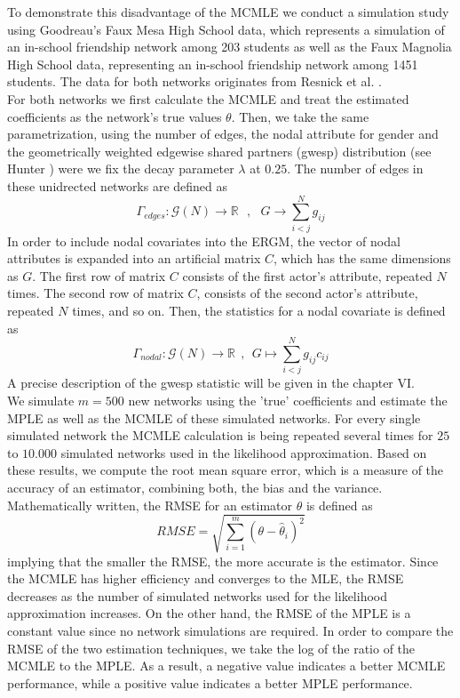 \documentclass[10pt, conference, compsocconf]{IEEEtran}
\begin{document}
\noindent To demonstrate this disadvantage of the MCMLE we conduct a simulation study using Goodreau's Faux Mesa High School data, which represents a simulation of an in-school friendship network among 203 students as well as the Faux Magnolia High School data, representing an in-school friendship network among 1451 students. The data for both networks originates from Resnick et al. \cite{Resnicketal1997}.\\[0.3cm]
For both networks we first calculate the MCMLE and treat the estimated coefficients as the network's true values $\theta$. Then, we take the same parametrization, using the number of edges, the nodal attribute for gender and the geometrically weighted edgewise shared partners (gwesp) distribution (see Hunter \cite{Hunter.2006}) were we fix the decay parameter $\lambda$ at $0.25$.
The number of edges in these unidrected networks are defined as
$$\Gamma_{edges}: \mathcal{G}(N) \to \mathbb{R}~~~, ~~~ G \to \sum_{i<j}^N g_{ij}$$
In order to include nodal covariates into the ERGM, the vector of nodal attributes is expanded into an artificial matrix $C$, which has the same dimensions as $G$. The first row of matrix $C$ consists of the first actor's attribute, repeated $N$ times. The second row of matrix $C$, consists of the second actor's attribute, repeated $N$ times, and so on. Then, the statistics for a nodal covariate is defined as
$$\Gamma_{nodal}: \mathcal{G}(N) \to \mathbb{R}~~,~~G \mapsto \sum_{i<j}^{N}g_{ij}c_{ij}$$
A precise description of the gwesp statistic will be given in the chapter VI.\\[0.3cm]
We simulate $m=500$ new networks using the 'true' coefficients and estimate the MPLE as well as the MCMLE of these simulated networks. For every single simulated network the MCMLE calculation is being repeated several times for $25$ to $10.000$ simulated networks used in the likelihood approximation.
Based on these results, we compute the root mean square error, which is a measure of the accuracy of an estimator, combining both, the bias and the variance. Mathematically written, the RMSE for an estimator $\hat{\theta}$ is defined as 
$$RMSE = \sqrt{\sum_{i=1}^{m}(\theta - \hat{\theta}_i)^2}$$
implying that the smaller the RMSE, the more accurate is the estimator. Since the MCMLE has higher efficiency and converges to the MLE, the RMSE decreases as the number of simulated networks used for the likelihood approximation increases. On the other hand, the RMSE of the MPLE is a constant value since no network simulations are required. In order to compare the RMSE of the two estimation techniques, we take the log of the ratio of the MCMLE to the MPLE. As a result, a negative value indicates a better MCMLE performance, while a positive value indicates a better MPLE performance.\\[0.3cm] 
\end{document}
